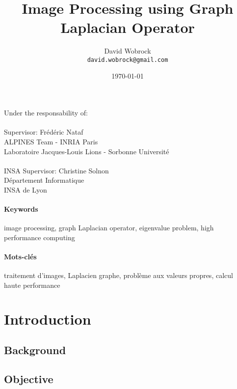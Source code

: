 \documentclass[]{article}
\title{Image Processing using Graph Laplacian Operator}
\author{David Wobrock \\ \texttt{david.wobrock@gmail.com}}
\date{\today}
\begin{document}
\maketitle

Under the responsability of:\\ \\
Supervisor: Frédéric Nataf\\
ALPINES Team - INRIA Paris\\
Laboratoire Jacques-Louis Lions - Sorbonne Université \\ \\
INSA Supervisor: Christine Solnon\\
Département Informatique\\
INSA de Lyon

\begin{abstract}
 
\end{abstract}

\paragraph{Keywords}
image processing, graph Laplacian operator, eigenvalue problem, high performance computing

\begin{otherlanguage}{french}
  \begin{abstract}
   
  \end{abstract}
\end{otherlanguage}

\paragraph{Mots-clés}
traitement d'images, Laplacien graphe, problème aux valeurs propres, calcul haute performance

\section{Introduction}

\subsection{Background}


\subsection{Objective}

\end{document}
